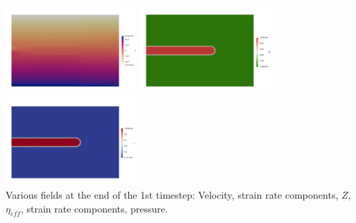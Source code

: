 \begin{center}
\includegraphics[width=5cm]{python_codes/fieldstone_64/results/beam/q}
\includegraphics[width=5cm]{python_codes/fieldstone_64/results/beam/rho}
\includegraphics[width=5cm]{python_codes/fieldstone_64/results/beam/Z}\\
{\captionfont Various fields at the end of the 1st timestep: 
Velocity, strain rate components, $Z$, $\eta_{eff}$, strain rate components, pressure.}
\end{center}

